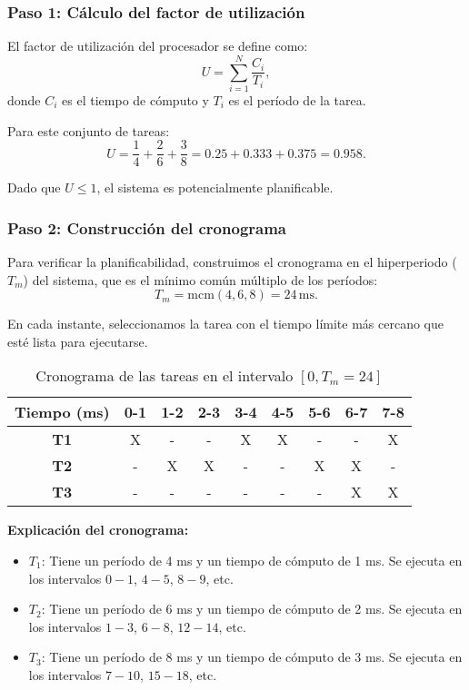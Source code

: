 \documentclass[a4paper,12pt]{article}
\begin{document}
\subsubsection{Paso 1: Cálculo del factor de utilización}
El factor de utilización del procesador se define como:
\[
U = \sum_{i=1}^{N} \frac{C_i}{T_i},
\]
donde \(C_i\) es el tiempo de cómputo y \(T_i\) es el período de la tarea.

Para este conjunto de tareas:
\[
U = \frac{1}{4} + \frac{2}{6} + \frac{3}{8} = 0.25 + 0.333 + 0.375 = 0.958.
\]

Dado que \(U \leq 1\), el sistema es potencialmente planificable.

\subsubsection{Paso 2: Construcción del cronograma}
Para verificar la planificabilidad, construimos el cronograma en el hiperperiodo (\(T_m\)) del sistema, que es el mínimo común múltiplo de los períodos:
\[
T_m = \text{mcm}(4, 6, 8) = 24 \, \text{ms}.
\]

En cada instante, seleccionamos la tarea con el tiempo límite más cercano que esté lista para ejecutarse.

\begin{table}[H]
\centering
\begin{tabular}{|c|c|c|c|c|c|c|c|c|}
\hline
\textbf{Tiempo (ms)} & 0-1 & 1-2 & 2-3 & 3-4 & 4-5 & 5-6 & 6-7 & 7-8 \\ \hline
\textbf{T1} & X & - & - & X & X & - & - & X \\ \hline
\textbf{T2} & - & X & X & - & - & X & X & - \\ \hline
\textbf{T3} & - & - & - & - & - & - & X & X \\ \hline
\end{tabular}
\caption{Cronograma de las tareas en el intervalo \([0, T_m = 24]\)}
\end{table}

\textbf{Explicación del cronograma:}
\begin{itemize}
    \item \(T_1\): Tiene un período de 4 ms y un tiempo de cómputo de 1 ms. Se ejecuta en los intervalos \(0-1\), \(4-5\), \(8-9\), etc.
    \item \(T_2\): Tiene un período de 6 ms y un tiempo de cómputo de 2 ms. Se ejecuta en los intervalos \(1-3\), \(6-8\), \(12-14\), etc.
    \item \(T_3\): Tiene un período de 8 ms y un tiempo de cómputo de 3 ms. Se ejecuta en los intervalos \(7-10\), \(15-18\), etc.
\end{itemize}
\end{document}
